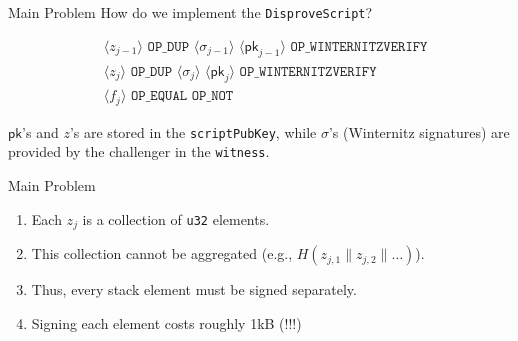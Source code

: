 \documentclass{zkdl-presentation-template}
\newcommand{\elem}[1]{\, \langle #1 \rangle \,}
\newcommand{\opcode}[1]{\, \texttt{#1} \,}
\begin{document}
     \begin{frame}{Main Problem}
        How do we implement the \texttt{DisproveScript}?\pause

        \begin{empheqboxed}
          \begin{align*}
            &\elem{z_{j-1}} \opcode{OP\_DUP} \elem{\sigma_{j-1}}
            \elem{\mathsf{pk}_{j-1}} \opcode{OP\_WINTERNITZVERIFY} \\
            &\elem{z_{j}} \opcode{OP\_DUP} \elem{\sigma_{j}}
            \elem{\mathsf{pk}_{j}} \opcode{OP\_WINTERNITZVERIFY} \\
            &\elem{f_j} \opcode{OP\_EQUAL} \opcode{OP\_NOT}
          \end{align*}
        \end{empheqboxed}

        \pause $\mathsf{pk}$'s and $z$'s are stored in the \texttt{scriptPubKey}, while $\sigma$'s (Winternitz signatures) are provided by the challenger in the \texttt{witness}.\pause

        \begin{alertblock}{Main Problem}
            \begin{enumerate}
                \item Each $z_j$ is a collection of \texttt{u32} elements.\pause
                \item This collection cannot be aggregated (e.g., $H(z_{j,1} \parallel z_{j,2} \parallel \dots )$).\pause
                \item Thus, every stack element must be signed separately.\pause
                \item Signing each element costs roughly 1kB \textcolor{red!70!black}{(!!!)}
            \end{enumerate}
        \end{alertblock}
    \end{frame}
    
\end{document}
